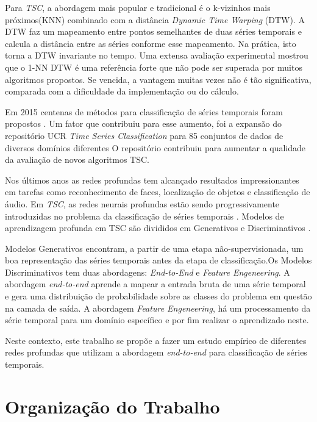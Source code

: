 Para \textit{TSC}, a abordagem mais popular e tradicional é o k-vizinhos mais próximos(KNN) combinado com a distância \textit{Dynamic Time Warping} (DTW). A DTW faz um mapeamento entre pontos semelhantes de duas séries temporais e calcula a distância entre as séries conforme esse mapeamento. Na prática, isto torna a DTW invariante no tempo.  Uma extensa avaliação experimental \cite{Bagnall2017} mostrou que o 1-NN DTW é uma referência forte que não pode ser superada por muitos algoritmos propostos. Se vencida, a vantagem muitas vezes não é tão significativa, comparada com a dificuldade da implementação ou do cálculo.

Em 2015 centenas de métodos para classificação de séries temporais foram propostos \cite{Bagnall2017}. Um fator que contribuiu para esse aumento, foi  a expansão do repositório UCR \textit{Time Series Classification} para 85 conjuntos de dados de diversos domínios diferentes  O repositório contribuiu para aumentar a qualidade da avaliação de novos algoritmos TSC. 

Nos últimos anos as redes profundas tem alcançado resultados impressionantes em tarefas como reconhecimento de faces, localização de objetos e classificação de áudio. Em \textit{TSC}, as redes neurais profundas estão sendo progressivamente introduzidas no problema da classificação de séries temporais \cite{Zheng2014} \cite{Wang01}  \cite{tscFromScratch}. Modelos de aprendizagem profunda em TSC são divididos em Generativos e Discriminativos \cite{ismail2018}.

Modelos Generativos encontram, a partir de uma etapa não-supervisionada, um boa representação das séries temporais antes da etapa de classificação.Os Modelos Discriminativos tem duas abordagens: \textit{End-to-End} e \textit{Feature Engeneering}. A abordagem \textit{end-to-end} aprende a mapear a entrada bruta de uma série temporal e gera uma distribuição de probabilidade sobre as classes do problema em questão na camada de saída. A abordagem \textit{Feature Engeneering}, há um processamento da série temporal para um domínio específico e por fim realizar o aprendizado neste. 

Neste contexto, este trabalho se propõe a fazer um estudo empírico de diferentes redes profundas que utilizam a abordagem \textit{end-to-end} para classificação de séries temporais.




\section{Organização do Trabalho}

